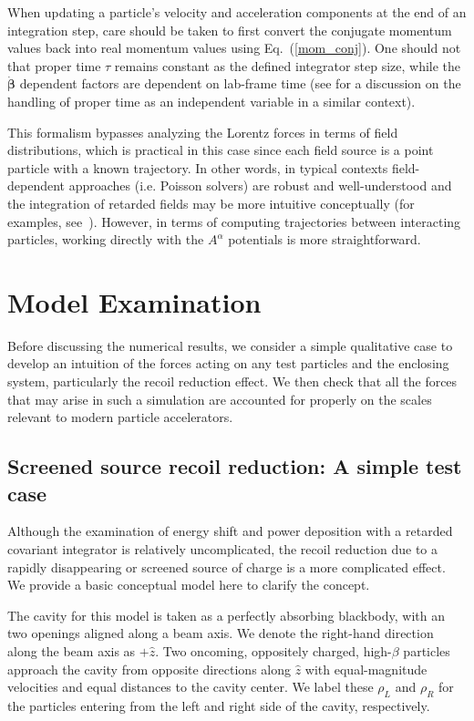 \documentclass[reprint,
               amsmath,amssymb,nofootinbib, aps%
              ]{revtex4-2}
\begin{document}
When updating a particle's velocity and acceleration components at the end of an integration step, care should be taken to first convert the conjugate momentum values back into real momentum values using Eq.~(\ref{mom_conj}). One should not that proper time $\tau$ remains constant as the defined integrator step size, while the $\boldsymbol{\dot{\beta}}$ dependent factors are dependent on lab-frame time (see \cite{laface_2020_covariant} for a discussion on the handling of proper time as an independent variable in a similar context).

This formalism bypasses analyzing the Lorentz forces in terms of field distributions, which is practical in this case since each field source is a point particle with a known trajectory. In other words, in typical contexts field-dependent approaches (i.e. Poisson solvers) are robust and well-understood and the integration of retarded fields may be more intuitive conceptually (for examples, see~\cite{Ryne:IPAC2018-THPAK044,ryne:ipac12-tuppp036,quattromini_LW_2009}). However, in terms of computing trajectories between interacting particles, working directly with the $A^{\alpha}$ potentials is more straightforward.

\section{Model Examination}\label{model_verification}
Before discussing the numerical results, we consider a simple qualitative case to develop an intuition of the forces acting on any test particles and the enclosing system, particularly the recoil reduction effect. We then check that all the forces that may arise in such a simulation are accounted for properly on the scales relevant to modern particle accelerators.

\subsection{Screened source recoil reduction: A simple test case }\label{sec:recoil_reduct_pedagog}
\vspace{-0.2cm}
Although the examination of energy shift and power deposition with a retarded covariant integrator is relatively uncomplicated, the recoil reduction due to a rapidly disappearing or screened source of charge is a more complicated effect. We provide a basic conceptual model here to clarify the concept.

The cavity for this model is taken as a perfectly absorbing blackbody, with an two openings aligned along a beam axis. We denote the right-hand direction along the beam axis as $+\hat{z}$.
Two oncoming, oppositely charged, high-$\beta$ particles approach the cavity from opposite directions along $\hat{z}$ with equal-magnitude velocities and equal distances to the cavity center. We label these $\rho_L$ and $\rho_{R}$ for the particles entering from the left and right side of the cavity, respectively.
\end{document}
